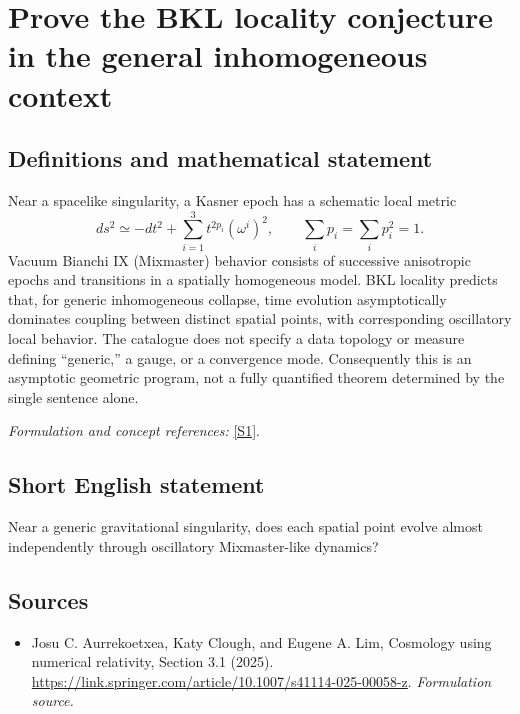 \documentclass[11pt]{article}
\begin{document}
\section*{\texorpdfstring{Prove the BKL locality conjecture in the general inhomogeneous context}{Prove the BKL locality conjecture in the general inhomogeneous context}}\label{30006736}
\subsection{Definitions and mathematical statement}
Near a spacelike singularity, a Kasner epoch has a schematic local metric
\[
 ds^2\simeq-dt^2+\sum_{i=1}^3t^{2p_i}(\omega^i)^2,\qquad
 \sum_i p_i=\sum_i p_i^2=1.
\]
Vacuum Bianchi IX (Mixmaster) behavior consists of successive anisotropic epochs and transitions in a spatially homogeneous model. BKL locality predicts that, for generic inhomogeneous collapse, time evolution asymptotically dominates coupling between distinct spatial points, with corresponding oscillatory local behavior. The catalogue does not specify a data topology or measure defining ``generic,'' a gauge, or a convergence mode. Consequently this is an asymptotic geometric program, not a fully quantified theorem determined by the single sentence alone.
\par\smallskip\textit{Formulation and concept references:} \href{https://link.springer.com/article/10.1007/s41114-025-00058-z}{[S1]}.

\subsection{Short English statement}
Near a generic gravitational singularity, does each spatial point evolve almost independently through oscillatory Mixmaster-like dynamics?
\subsection{Sources}
\begin{itemize}
\item[S1]Josu C. Aurrekoetxea, Katy Clough, and Eugene A. Lim, Cosmology using numerical relativity, Section 3.1 (2025).
\url{https://link.springer.com/article/10.1007/s41114-025-00058-z}.
\textit{Formulation source.}
\end{itemize}
\end{document}

